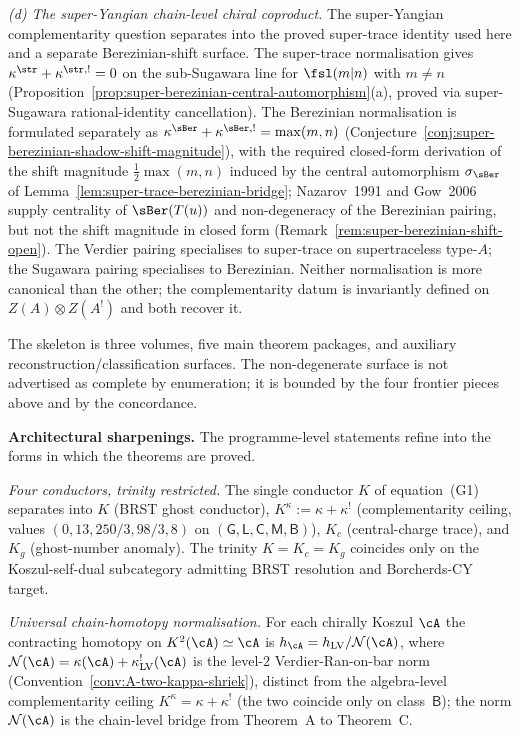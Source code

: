 \noindent\emph{(d) The super-Yangian chain-level chiral
coproduct.}\enspace
The super-Yangian complementarity question separates into the
proved super-trace identity used here and a separate Berezinian-shift
surface. The
super-trace normalisation gives
$\kappa^{\str} + \kappa^{\str,!} = 0$ on the sub-Sugawara line
for $\fsl(m|n)$ with $m\neq n$
(Proposition~\ref{prop:super-berezinian-central-automorphism}(a),
proved via super-Sugawara rational-identity cancellation). The
Berezinian normalisation is formulated separately as
$\kappa^{\sBer} + \kappa^{\sBer,!} = \max(m,n)$
(Conjecture~\ref{conj:super-berezinian-shadow-shift-magnitude}),
with the required closed-form derivation of the shift magnitude
$\tfrac{1}{2}\max(m,n)$ induced by the central automorphism
$\sigma_{\sBer}$ of
Lemma~\ref{lem:super-trace-berezinian-bridge}; Nazarov~1991 and
Gow~2006 supply centrality of $\sBer(T(u))$ and non-degeneracy of
the Berezinian pairing, but not the shift magnitude in closed
form (Remark~\ref{rem:super-berezinian-shift-open}). The Verdier pairing specialises
to super-trace on supertraceless type-$A$; the Sugawara pairing
specialises to Berezinian. Neither normalisation is more
canonical than the other; the complementarity datum is
invariantly defined on $Z(A) \otimes Z(A^{!})$ and both recover
it.

\medskip

\noindent
The skeleton is three volumes, five main theorem packages, and
auxiliary reconstruction/classification surfaces. The non-degenerate
surface is not advertised as complete by enumeration; it is bounded by
the four frontier pieces above and by the concordance.

\medskip

\noindent\textbf{Architectural sharpenings.}\enspace
The programme-level statements refine into the forms in which the
theorems are proved.

\emph{Four conductors, trinity restricted.} The single conductor
$K$ of equation~(G1) separates into $K$ (BRST ghost conductor),
$K^\kappa := \kappa+\kappa^!$ (complementarity ceiling, values
$(0,13,250/3,98/3,8)$ on $(\mathsf G,\mathsf L,\mathsf C,\mathsf M,\mathsf B)$),
$K_c$ (central-charge trace), and $K_g$ (ghost-number anomaly). The
trinity $K=K_c=K_g$ coincides only on the Koszul-self-dual subcategory
admitting BRST resolution and Borcherds-CY target.

\emph{Universal chain-homotopy normalisation.} For each chirally
Koszul $\cA$ the contracting homotopy on $K^2(\cA)\simeq\cA$ is
$h_\cA = h_{\mathrm{LV}}/\mathcal N(\cA)$, where
$\mathcal N(\cA)=\kappa(\cA)+\kappa^!_{\mathrm{LV}}(\cA)$ is the
level-$2$ Verdier-Ran-on-bar norm
(Convention~\ref{conv:A-two-kappa-shriek}), distinct from the
algebra-level complementarity ceiling $K^\kappa=\kappa+\kappa^!$
(the two coincide only on class~$\mathsf B$); the norm
$\mathcal N(\cA)$ is the chain-level bridge from Theorem~A to
Theorem~C.

